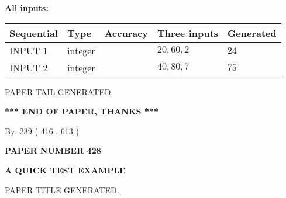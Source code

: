 \documentclass[12pt]{article}
\begin{document}
   
   
   
\noindent\vspace{0.1in}\hspace{-0.08in} {\textbf{\Large{All inputs: }}}
   
   
  
  
\noindent\begin{tabular}{|l|l|l|l|l|}
\hline
 Sequential & Type & Accuracy & Three inputs & Generated \\ 
\hline
 
 
  INPUT $  1 $ & integer &  & $
 20
 , 
 60
 , 
 2
 $ & $ 24 $ 
 \\  \hline  
 
 
  INPUT $  2 $ & integer &  & $
 40
 , 
 80
 , 
 7
 $ & $ 75 $ 
 \\  \hline  
 \end{tabular}
   
   
   
   
   
   
 \vspace{0.2in}
 
   
   
\vspace{2.0in} PAPER TAIL GENERATED.
   
   
   
   
\vspace{1.0in} 
{\textbf{\large{ *** END OF PAPER, THANKS *** }}} 
   
   
\hspace{1.0in} By: 
 239 ( 416 ,  613 )
   
   
   
   
\newpage 
\setcounter{page}{ 
   428001 } 
   
   
   
   
 {\textbf{ \Large{ PAPER NUMBER  428  }}}
   
   
\vspace{0.2in}
   
   
   
   
   
   
   
   
 \vspace{0.2in}
{\LARGE {\textbf{ A QUICK TEST EXAMPLE}}}
   
   
 PAPER TITLE GENERATED.
   
   
   
\vspace{0.2in}
   
\end{document}

